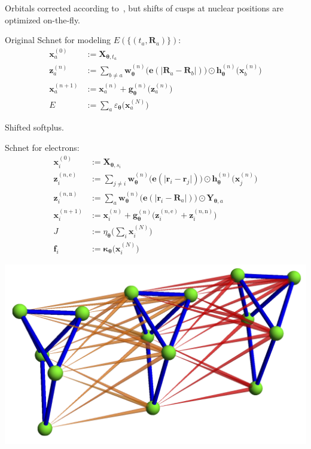 Orbitals corrected according to~\citet{MaJCP05}, but shifts of cusps at nuclear positions are optimized on-the-fly.

Original Schnet for modeling $E(\{(t_a,\mathbf R_a)\})$:
\begin{equation}
\begin{aligned}
\mathbf x_a^{(0)}&:=\mathbf X_{\boldsymbol\theta,t_a} \\
\mathbf z_a^{(n)}&:=\sum\nolimits_{b\neq a}
  \mathbf w_{\boldsymbol\theta}^{(n)}
  \big(\mathbf e(\lvert\mathbf R_a-\mathbf R_b\rvert)\big)
  \odot\mathbf h^{(n)}_{\boldsymbol\theta}
  \big(\mathbf x_b^{(n)}\big) \\
\mathbf x_a^{(n+1)}&:=\mathbf x_a^{(n)}
  +\mathbf g_{\boldsymbol\theta}^{(n)}
  \big(\mathbf z_a^{(n)}\big) \\
E&:=\sum\nolimits_a\varepsilon_{\boldsymbol\theta}
  \big(\mathbf x_a^{(N)}\big)
\end{aligned}
\end{equation}

Shifted softplus.

Schnet for electrons:
\begin{equation}
\begin{aligned}
\mathbf x_i^{(0)}&:=\mathbf X_{\boldsymbol\theta,s_i} \\
\mathbf z_i^{(n,\mathrm e)}&:=\sum\nolimits_{j\neq i}
  \mathbf w^{(n)}_{\boldsymbol\theta}
  \big(\mathbf e(\lvert\mathbf r_i-\mathbf r_j\rvert)\big)
  \odot\mathbf h_{\boldsymbol\theta}^{(n)}\big(\mathbf x_j^{(n)}\big) \\ 
\mathbf z_i^{(n,\mathrm n)}&:=\sum\nolimits_a
  \mathbf w_{\boldsymbol\theta}^{(n)}
  \big(\mathbf e(\lvert\mathbf r_i-\mathbf R_a\rvert)\big)
  \odot\mathbf Y_{\boldsymbol\theta,a} \\
\mathbf x_i^{(n+1)}&:=\mathbf x_i^{(n)}
  +\mathbf g^{(n)}_{\boldsymbol\theta}
  \big(\mathbf z_i^{(n,\mathrm e)}+\mathbf z_i^{(n,\mathrm n)}\big) \\
J&:=\eta_{\boldsymbol\theta}
  \big(\textstyle\sum_i\mathbf x_i^{(N)}\big) \\
\mathbf f_i&:=\boldsymbol\kappa_{\boldsymbol\theta}\big(\mathbf x_i^{(N)}\big)
\end{aligned}
\end{equation}


\includegraphics[width=\linewidth]{figs/gcnn.png}

